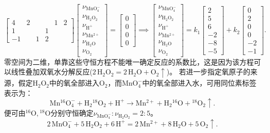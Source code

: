 \begin{example}
\[\begin{bmatrix}
			4&2&&&1&2\\
			1&&&1\\
			-1&&1&2
		\end{bmatrix}
		\begin{bmatrix}
			\nu_\mathrm{MnO_4^-}\\\nu_\mathrm{H_2O_2}\\\nu_\mathrm{H^+}\\\nu_\mathrm{Mn^{2+}}\\\nu_\mathrm{H_2O}\\\nu_\mathrm{O_2}
		\end{bmatrix} = \begin{bmatrix}
			0\\0\\0\\0
		\end{bmatrix}
		\implies
		\begin{bmatrix}
			\nu_\mathrm{MnO_4^-}\\\nu_\mathrm{H_2O_2}\\\nu_\mathrm{H^+}\\\nu_\mathrm{Mn^{2+}}\\\nu_\mathrm{H_2O}\\\nu_\mathrm{O_2}
		\end{bmatrix} = k_1\begin{bmatrix}
			2\\5\\6\\-2\\-8\\-5
		\end{bmatrix} + k_2\begin{bmatrix}
			0\\2\\0\\0\\-2\\-1
		\end{bmatrix}.
	\]
	零空间为二维，单靠这些守恒方程不能唯一确定反应的系数比，这是因为该方程可以线性叠加双氧水分解反应($\mathrm{2\,H_2O_2=2\,H_2O+O_2\uparrow}$)。
	若进一步指定氧原子的来源，假定$\mathrm{H_2O_2}$中的氧全部进入$\mathrm{O_2}$，而$\mathrm{MnO_4^-}$中的氧全部进入水，可用同位素标签表示为：
	\[
		\mathrm{Mn{}^{16}O_4^-+H_2{}^{18}O_2+H^+\to Mn^{2+}+H_2{}^{16}O+{}^{18}O_2\uparrow}.
	\]	
	便可由$\mathrm{{}^{16}O,{}^{18}O}$分别守恒确定$\nu_\mathrm{MnO_4^-}:\nu_\mathrm{H_2O_2} = 2:5$。
	\[
		\mathrm{2\,MnO_4^-+5\,H_2O_2+6\,H^+=2\,Mn^{2+}+8\,H_2O+5\,O_2\uparrow}.
	\]
\end{example}


